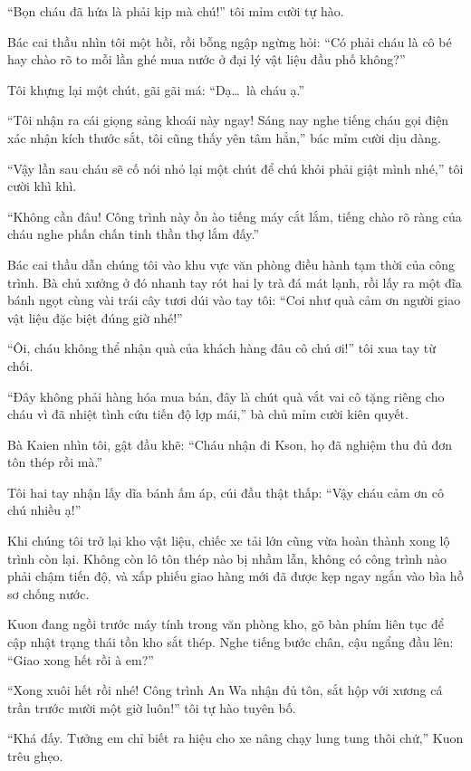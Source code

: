 ﻿\documentclass[../main.tex]{subfiles}
\begin{document}
``Bọn cháu đã hứa là phải kịp mà chú!'' tôi mỉm cười tự hào.

Bác cai thầu nhìn tôi một hồi, rồi bỗng ngập ngừng hỏi: ``Có phải cháu là cô bé hay chào rõ to mỗi lần ghé mua nước ở đại lý vật liệu đầu phố không?''

Tôi khựng lại một chút, gãi gãi má: ``Dạ\dots\ là cháu ạ.''

``Tôi nhận ra cái giọng sảng khoái này ngay! Sáng nay nghe tiếng cháu gọi điện xác nhận kích thước sắt, tôi cũng thấy yên tâm hẳn,'' bác mỉm cười dịu dàng.

``Vậy lần sau cháu sẽ cố nói nhỏ lại một chút để chú khỏi phải giật mình nhé,'' tôi cười khì khì.

``Không cần đâu! Công trình này ồn ào tiếng máy cắt lắm, tiếng chào rõ ràng của cháu nghe phấn chấn tinh thần thợ lắm đấy.''

Bác cai thầu dẫn chúng tôi vào khu vực văn phòng điều hành tạm thời của công trình. Bà chủ xưởng ở đó nhanh tay rót hai ly trà đá mát lạnh, rồi lấy ra một đĩa bánh ngọt cùng vài trái cây tươi dúi vào tay tôi: ``Coi như quà cảm ơn người giao vật liệu đặc biệt đúng giờ nhé!''

``Ôi, cháu không thể nhận quà của khách hàng đâu cô chú ơi!'' tôi xua tay từ chối.

``Đây không phải hàng hóa mua bán, đây là chút quà vắt vai cô tặng riêng cho cháu vì đã nhiệt tình cứu tiến độ lợp mái,'' bà chủ mỉm cười kiên quyết.

Bà Kaien nhìn tôi, gật đầu khẽ: ``Cháu nhận đi Kson, họ đã nghiệm thu đủ đơn tôn thép rồi mà.''

Tôi hai tay nhận lấy dĩa bánh ấm áp, cúi đầu thật thấp: ``Vậy cháu cảm ơn cô chú nhiều ạ!''

\ct

Khi chúng tôi trở lại kho vật liệu, chiếc xe tải lớn cũng vừa hoàn thành xong lộ trình còn lại. Không còn lô tôn thép nào bị nhầm lẫn, không có công trình nào phải chậm tiến độ, và xấp phiếu giao hàng mới đã được kẹp ngay ngắn vào bìa hồ sơ chống nước.

Kuon đang ngồi trước máy tính trong văn phòng kho, gõ bàn phím liên tục để cập nhật trạng thái tồn kho sắt thép. Nghe tiếng bước chân, cậu ngẩng đầu lên: ``Giao xong hết rồi à em?''

``Xong xuôi hết rồi nhé! Công trình An Wa nhận đủ tôn, sắt hộp với xương cá trần trước mười một giờ luôn!'' tôi tự hào tuyên bố.

``Khá đấy. Tưởng em chỉ biết ra hiệu cho xe nâng chạy lung tung thôi chứ,'' Kuon trêu ghẹo.
\end{document}
